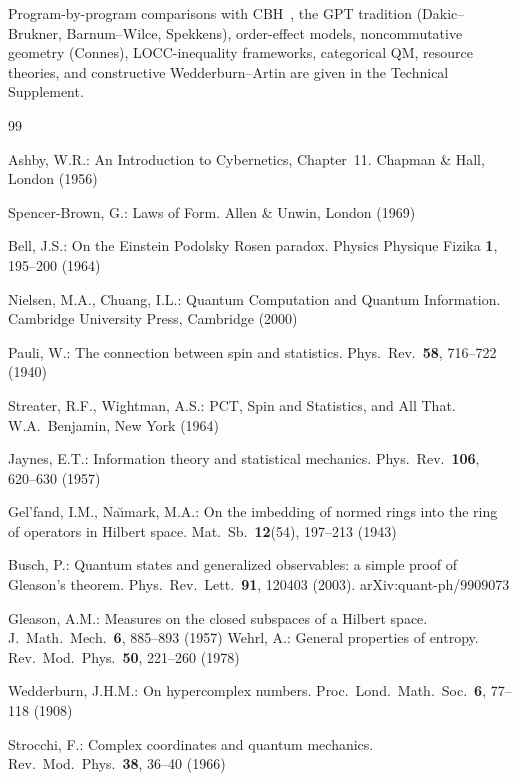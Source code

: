 \documentclass[11pt]{article}
\theoremstyle{remark}
\begin{document}
Program-by-program comparisons with CBH~\cite{CBH2003}, the GPT tradition (Dakic--Brukner, Barnum--Wilce, Spekkens), order-effect models, noncommutative geometry (Connes), LOCC-inequality frameworks, categorical QM, resource theories, and constructive Wedderburn--Artin are given in the Technical Supplement.


\begin{thebibliography}{99}

 Ashby, W.R.: An Introduction to Cybernetics, Chapter~11. Chapman \& Hall, London (1956)

 Spencer-Brown, G.: Laws of Form. Allen \& Unwin, London (1969)

 Bell, J.S.: On the Einstein Podolsky Rosen paradox. Physics Physique Fizika \textbf{1}, 195--200 (1964)

 Nielsen, M.A., Chuang, I.L.: Quantum Computation and Quantum Information. Cambridge University Press, Cambridge (2000)

 Pauli, W.: The connection between spin and statistics. Phys.\ Rev.\ \textbf{58}, 716--722 (1940)

 Streater, R.F., Wightman, A.S.: PCT, Spin and Statistics, and All That. W.A.\ Benjamin, New York (1964)

 Jaynes, E.T.: Information theory and statistical mechanics. Phys.\ Rev.\ \textbf{106}, 620--630 (1957)

 Gel'fand, I.M., Na\u{\i}mark, M.A.: On the imbedding of normed rings into the ring of operators in Hilbert space. Mat.\ Sb.\ \textbf{12}(54), 197--213 (1943)

 Busch, P.: Quantum states and generalized observables: a simple proof of Gleason's theorem. Phys.\ Rev.\ Lett.\ \textbf{91}, 120403 (2003). arXiv:quant-ph/9909073

 Gleason, A.M.: Measures on the closed subspaces of a Hilbert space. J.\ Math.\ Mech.\ \textbf{6}, 885--893 (1957)
 Wehrl, A.: General properties of entropy. Rev.\ Mod.\ Phys.\ \textbf{50}, 221--260 (1978)

 Wedderburn, J.H.M.: On hypercomplex numbers. Proc.\ Lond.\ Math.\ Soc.\ \textbf{6}, 77--118 (1908)

 Strocchi, F.: Complex coordinates and quantum mechanics. Rev.\ Mod.\ Phys.\ \textbf{38}, 36--40 (1966)


\end{thebibliography}
\end{document}
